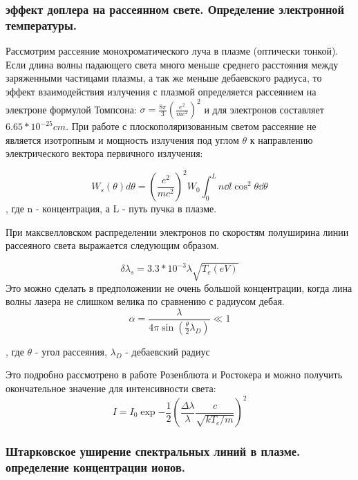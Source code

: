 \documentclass[10pt, a4paper]{article}
\begin{document}
\subsubsection{эффект доплера на рассеянном свете. Определение электронной температуры.}

Рассмотрим рассеяние монохроматического луча в плазме (оптически тонкой). Если длина волны падающего света много меньше среднего расстояния между заряженными частицами плазмы, а так же меньше дебаевского радиуса, то эффект взаимодействия излучения с плазмой определяется рассеянием на электроне формулой Томпсона: $\sigma =\frac{8\pi}{3} (\frac{e^{2}}{mc^{2}})^{2}$ и для электронов составляет $6.65*10^{-25} cm$.
При работе с плоскополяризованным светом рассеяние не является изотропным и мощность излучения под углом $\theta$ к направлению электрического вектора первичного излучения:

\begin{equation}
	W_{s} (\theta) d\theta=\left(\frac{e^{2}}{mc^{2}}\right)^{2} W_0 \int_{0}^{L} n \dd l \cos^{2}\theta \dd \theta
\end{equation}
, где n -  концентрация, а L - путь пучка в плазме.

При максвелловском распределении электронов по скоростям полуширина линии рассеяного света выражается следующим образом.

\begin{equation}
	\delta \lambda_s = 3.3*10^{-3} \lambda \sqrt{T_e (eV)}
\end{equation}
Это можно сделать в предположении не очень большой концентрации, когда лина волны лазера не слишком велика по сравнению с радиусом дебая.
\begin{equation}
	\alpha = \frac{\lambda}{4\pi \sin(\frac{\theta}{2} \lambda_D)} \ll 1
\end{equation}

, где $\theta$ - угол рассеяния, $\lambda_D$ - дебаевский радиус

Это подробно рассмотрено в работе Розенблюта и Ростокера и можно получить окончательное значение для интенсивности света:
\begin{equation}
	I=I_0 \exp{- \frac{1}{2} (\frac{\Delta \lambda}{\lambda} \frac{c}{\sqrt{kT_e /m}})^{2}}
\end{equation}


\subsubsection{ Штарковское уширение спектральных линий в плазме. определение концентрации ионов.}
\end{document}
